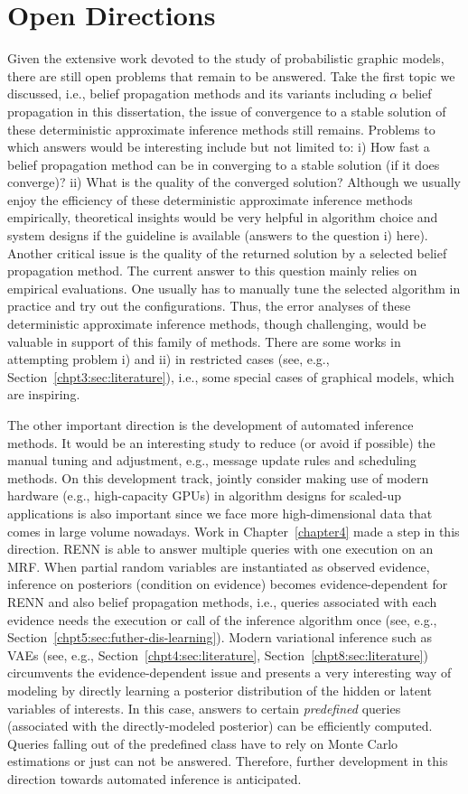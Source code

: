 \section{Open Directions}
Given the extensive work devoted to the study of probabilistic graphic models, there are still open problems that remain to be answered. Take the first topic we discussed, i.e., belief propagation methods and its variants including $\alpha$ belief propagation in this dissertation, the issue of convergence to a stable solution of these deterministic approximate inference methods still remains. Problems to which answers would be interesting include but not limited to: i) How fast a belief propagation method can be in converging to a stable solution (if it does converge)? ii) What is the quality of the converged solution? Although we usually enjoy the efficiency of these deterministic approximate inference methods empirically, theoretical insights would be very helpful in algorithm choice and system designs if the guideline is available (answers to the question i) here). Another critical issue is the quality of the returned solution by a selected belief propagation method. The current answer to this question mainly relies on empirical evaluations. One usually has to manually tune the selected algorithm in practice and try out the configurations. Thus, the error analyses of these deterministic approximate inference methods, though challenging, would be valuable in support of this family of methods. There are some works in attempting problem i) and ii) in restricted cases (see, e.g., Section~\ref{chpt3:sec:literature}), i.e., some special cases of graphical models, which are inspiring. 

The other important direction is the development of automated inference methods. It would be an interesting study to reduce (or avoid if possible) the manual tuning and adjustment, e.g., message update rules and scheduling methods. On this development track, jointly consider making use of modern hardware (e.g., high-capacity GPUs) in algorithm designs for scaled-up applications is also important since we face more high-dimensional data that comes in large volume nowadays. Work in Chapter~\ref{chapter4} made a step in this direction. RENN is able to answer multiple queries with one execution on an MRF. When partial random variables are instantiated as observed evidence, inference on posteriors (condition on evidence) becomes evidence-dependent for RENN and also belief propagation methods, i.e., queries associated with each evidence needs the execution or call of the inference algorithm once (see, e.g., Section~\ref{chpt5:sec:futher-dis-learning}). Modern variational inference such as VAEs (see, e.g., Section~\ref{chpt4:sec:literature}, Section~\ref{chpt8:sec:literature}) circumvents the evidence-dependent issue and presents a very interesting way of modeling by directly learning a posterior distribution of the hidden or latent variables of interests. In this case, answers to certain \textit{predefined} queries (associated with the directly-modeled posterior) can be efficiently computed. Queries falling out of the predefined class have to rely on Monte Carlo estimations or just can not be answered. Therefore, further development in this direction towards automated inference is anticipated.


